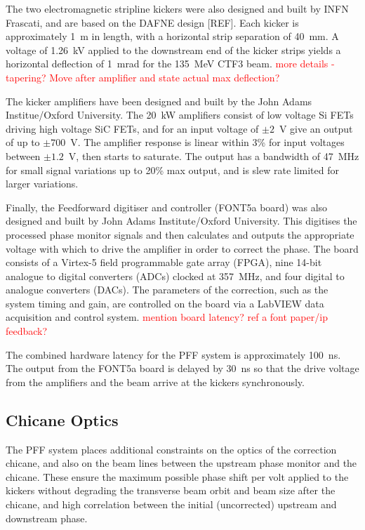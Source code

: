 \documentclass[%
 reprint,
superscriptaddress,
 amsmath,amssymb,
 prl,
]{revtex4-1}
\begin{document}
The two electromagnetic stripline kickers \cite{kickerIPAC11} were also 
designed and built by INFN 
Frascati,  
and are based on the DAFNE design [REF]. Each kicker is approximately 1~m in 
length, 
with a horizontal strip separation of 40~mm. A voltage of 1.26~kV applied to 
the 
downstream end of the kicker strips yields a horizontal deflection of 1~mrad 
for the 135~MeV CTF3 beam. \textcolor{red}{more details - tapering? Move after 
amplifier and state actual max deflection?}

The kicker amplifiers \cite{RobertsThesis} have been designed and built by the 
John Adams 
Institue/Oxford University. The 20~kW amplifiers consist of low voltage Si FETs 
driving high voltage SiC FETs, and for 
an input voltage of \(\pm2\)~V give an output of up to \(\pm700\)~V. The 
amplifier response is linear within 
3\% for input voltages between \(\pm1.2\)~V, then starts to saturate. The 
output 
has a bandwidth of 47~MHz for small signal variations up to 20\% max output, 
and is slew rate limited for larger variations.

Finally, the Feedforward digitiser and controller (FONT5a board) 
\cite{RobertsThesis} was also 
designed and built by John Adams Institute/Oxford University. This digitises 
the 
processed phase monitor signals and then calculates and outputs the appropriate 
voltage with which to drive the amplifier in order to correct the phase. The 
board consists of a Virtex-5 field programmable gate array (FPGA), nine 14-bit 
analogue to digital converters (ADCs) clocked at 357~MHz, and four digital to 
analogue converters (DACs). The parameters of the correction, such as the 
system timing and gain, are controlled on the board via a LabVIEW data 
acquisition and control system. \textcolor{red}{mention board latency? ref a 
font paper/ip feedback?}

The combined hardware latency for the PFF system is approximately 100~ns. The 
output from the FONT5a board is delayed by 30~ns so that the drive voltage from 
the amplifiers and the beam arrive at the kickers synchronously.

\subsection{\label{ss:optics}Chicane Optics}

The PFF system places additional constraints on the optics of the correction 
chicane, and also on the beam lines between the upstream phase monitor and the 
chicane. These ensure the maximum possible phase shift per volt applied to the 
kickers without degrading the transverse beam orbit and beam size after the 
chicane, and high correlation between the initial (uncorrected) upstream and 
downstream phase.
\end{document}
